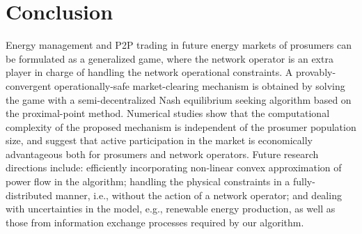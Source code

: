 \documentclass{IEEEtran}  %
\newcommand{\0}{\mathbf{0}}
\newcommand{\1}{\mathbf{1}}
\begin{document}
\section{Conclusion}
Energy management and P2P trading in future energy markets of prosumers can be formulated as a generalized game, where the network operator is an extra player in charge of handling the network operational constraints. A provably-convergent operationally-safe market-clearing mechanism is obtained by solving the game with a semi-decentralized Nash equilibrium seeking algorithm based on the proximal-point method.    
%
Numerical studies show that the computational complexity of the proposed mechanism is independent of the prosumer population size, and suggest that active participation in the market is economically advantageous both for prosumers and network operators.
%
Future research directions include: efficiently incorporating non-linear convex approximation of power flow in the algorithm; handling the physical constraints in a fully-distributed manner, i.e., without the action of a network operator; and dealing with uncertainties in the model, e.g., renewable energy production, as well as those from information exchange processes required by our algorithm.




\clearpage

\end{document}
